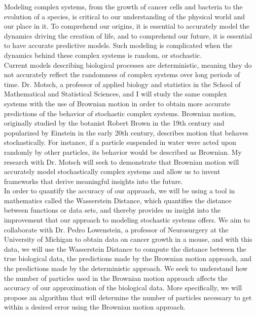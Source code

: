 \documentclass[8 pt, leqno]{article}
\begin{document}

Modeling complex systems, from the growth of cancer cells and bacteria to the evolution of a species, is critical to our understanding of the physical world and our place in it. To comprehend our origins, it is essential to accurately model the dynamics driving the creation of life, and to comprehend our future, it is essential to have accurate predictive models. Such modeling is complicated when the dynamics behind these complex systems is random, or stochastic.\\
\indent Current models describing biological processes are deterministic, meaning they do not accurately reflect the randomness of complex systems over long periods of time. Dr. Motsch, a professor of applied biology and statistics in the School of Mathematical and Statistical Sciences, and I will study the same complex systems with the use of Brownian motion in order to obtain more accurate predictions of the behavior of stochastic complex systems. Brownian motion, originally studied by the botanist Robert Brown in the 19th century and popularized by Einstein in the early 20th century, describes motion that behaves stochastically. For instance, if a particle suspended in water were acted upon randomly by other particles, its behavior would be described as Brownian. My research with Dr. Motsch will seek to demonstrate that Brownian motion will accurately model stochastically complex systems and allow us to invent frameworks that derive meaningful insights into the future.\\
\indent In order to quantify the accuracy of our approach, we will be using a tool in mathematics called the Wasserstein Distance, which quantifies the distance between functions or data sets, and thereby provides us insight into the improvement that our approach to modeling stochastic systems offers. We aim to collaborate with
Dr. Pedro Lowenstein, a professor of Neurosurgery at the University of Michigan to obtain data on cancer growth in a mouse, and with this data, we will use the Wasserstein Distance to compute the distance between the true biological data, the predictions made by the Brownian motion approach, and the predictions made by the deterministic approach. We seek to understand how the number of particles used in the Brownian motion approach affects the accuracy of our approximation of the biological data. More specifically, we will propose an algorithm that will determine the number of particles necessary to get within a desired error using the Brownian motion approach. \\
\end{document}
